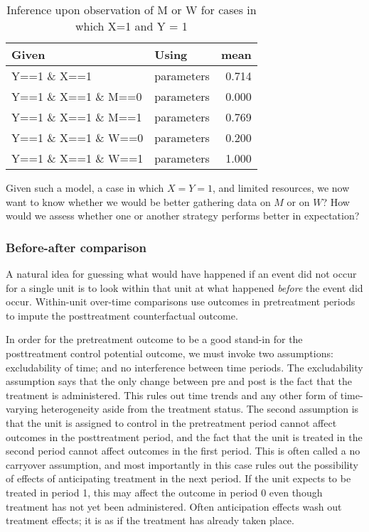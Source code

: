 \documentclass[
]{article}
\begin{document}
\begin{table}

\caption{\label{tab:unnamed-chunk-7}Inference upon observation of M or W for cases in which X=1 and Y = 1}
\centering
\begin{tabular}[t]{l|l|r}
\hline
Given & Using & mean\\
\hline
Y==1 \& X==1 & parameters & 0.714\\
\hline
Y==1 \& X==1 \& M==0 & parameters & 0.000\\
\hline
Y==1 \& X==1 \& M==1 & parameters & 0.769\\
\hline
Y==1 \& X==1 \& W==0 & parameters & 0.200\\
\hline
Y==1 \& X==1 \& W==1 & parameters & 1.000\\
\hline
\end{tabular}
\end{table}

Given such a model, a case in which \(X=Y=1\), and limited resources, we
now want to know whether we would be better gathering data on \(M\) or
on \(W\)? How would we assess whether one or another strategy performs
better in expectation?

\hypertarget{before-after-comparison}{%
\subsubsection{Before-after comparison}\label{before-after-comparison}}

A natural idea for guessing what would have happened if an event did not
occur for a single unit is to look within that unit at what happened
\emph{before} the event did occur. Within-unit over-time comparisons use
outcomes in pretreatment periods to impute the posttreatment
counterfactual outcome.

In order for the pretreatment outcome to be a good stand-in for the
posttreatment control potential outcome, we must invoke two assumptions:
excludability of time; and no interference between time periods. The
excludability assumption says that the only change between pre and post
is the fact that the treatment is administered. This rules out time
trends and any other form of time-varying heterogeneity aside from the
treatment status. The second assumption is that the unit is assigned to
control in the pretreatment period cannot affect outcomes in the
posttreatment period, and the fact that the unit is treated in the
second period cannot affect outcomes in the first period. This is often
called a no carryover assumption, and most importantly in this case
rules out the possibility of effects of anticipating treatment in the
next period. If the unit expects to be treated in period 1, this may
affect the outcome in period 0 even though treatment has not yet been
administered. Often anticipation effects wash out treatment effects; it
is as if the treatment has already taken place.
\end{document}
